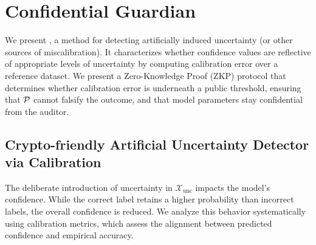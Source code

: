 




\section{Confidential Guardian}
\label{sec:detection}

We present \name, a method for detecting artificially induced uncertainty (or other sources of miscalibration). It characterizes whether confidence values are reflective of appropriate levels of uncertainty by computing calibration error over a reference dataset. We present a Zero-Knowledge Proof (ZKP) protocol that determines whether calibration error is underneath a public threshold, ensuring that $\mathcal{P}$ cannot falsify the outcome, and that model parameters stay confidential from the auditor.

\subsection{Crypto-friendly Artificial Uncertainty Detector via Calibration}

The deliberate introduction of uncertainty in \(\mathcal{X}_\text{unc}\) impacts the model's confidence. While the correct label retains a higher probability than incorrect labels, the overall confidence is reduced. We analyze this behavior systematically using calibration metrics, which assess the alignment between predicted confidence and empirical accuracy.

